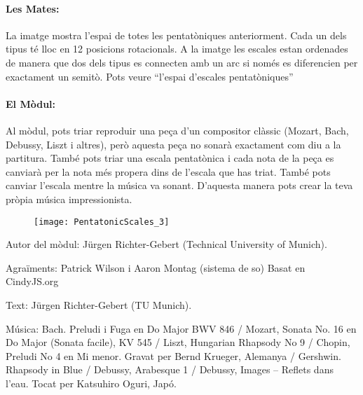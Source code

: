 \paragraph{Les Mates:}  La imatge mostra l'espai de totes les pentatòniques anteriorment. Cada un dels tipus té lloc en 12 posicions rotacionals. A la imatge les escales estan ordenades de manera que dos dels tipus es connecten amb un arc si només es diferencien per exactament un semitò. Pots veure ``l'espai d'escales pentatòniques''

\paragraph{El Mòdul:} Al mòdul, pots triar reproduir una peça d'un compositor clàssic (Mozart, Bach, Debussy, Liszt i altres), però aquesta peça no sonarà exactament com diu a la partitura. També pots triar una escala pentatònica i cada nota de la peça es canviarà per la nota més propera dins de l'escala que has triat. També pots canviar l'escala mentre la música va sonant. D'aquesta manera pots crear la teva pròpia música impressionista.

\begin{figure}
\centering
\texttt{[image: PentatonicScales\_3]}
\end{figure}

\begin{sectcredits}
\item[Autor del mòdul:] Jürgen Richter-Gebert (Technical University of Munich).

\item[Agraïments:] Patrick Wilson i Aaron Montag (sistema de so) Basat en CindyJS.org

\item[Text:] Jürgen Richter-Gebert (TU Munich).
\item[Música:] Bach. Preludi i Fuga en Do Major BWV 846 / Mozart, Sonata No. 16 en Do Major (Sonata facile), KV 545 / Liszt, Hungarian Rhapsody No 9 / Chopin, Preludi No 4  en Mi menor. Gravat per Bernd Krueger, Alemanya / Gershwin. Rhapsody in Blue / Debussy, Arabesque 1 / Debussy, Images -- Reflets dans l'eau. Tocat per Katsuhiro Oguri, Japó.
\end{sectcredits}
